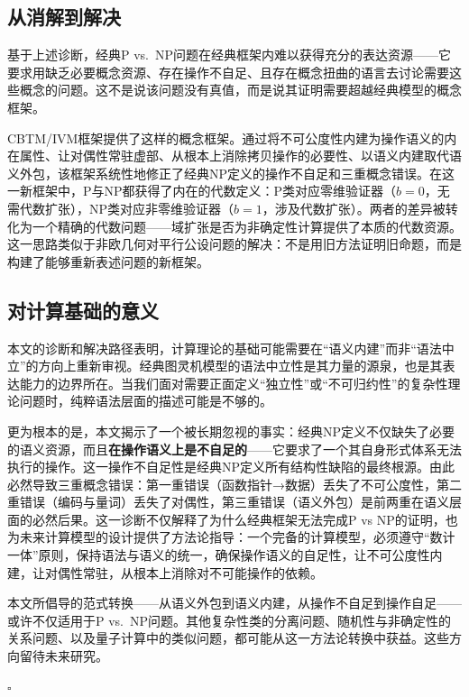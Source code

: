 \documentclass{ctexart}
\begin{document}
	\subsection{从消解到解决}
	
	基于上述诊断，经典P vs.\ NP问题在经典框架内难以获得充分的表达资源——它要求用缺乏必要概念资源、存在操作不自足、且存在概念扭曲的语言去讨论需要这些概念的问题。这不是说该问题没有真值，而是说其证明需要超越经典模型的概念框架。
	
	CBTM/IVM框架提供了这样的概念框架。通过将不可公度性内建为操作语义的内在属性、让对偶性常驻虚部、从根本上消除拷贝操作的必要性、以语义内建取代语义外包，该框架系统性地修正了经典NP定义的操作不自足和三重概念错误。在这一新框架中，P与NP都获得了内在的代数定义：P类对应零维验证器（$b=0$，无需代数扩张），NP类对应非零维验证器（$b=1$，涉及代数扩张）。两者的差异被转化为一个精确的代数问题——域扩张是否为非确定性计算提供了本质的代数资源。这一思路类似于非欧几何对平行公设问题的解决：不是用旧方法证明旧命题，而是构建了能够重新表述问题的新框架。
	
	\subsection{对计算基础的意义}
	
	本文的诊断和解决路径表明，计算理论的基础可能需要在``语义内建''而非``语法中立''的方向上重新审视。经典图灵机模型的语法中立性是其力量的源泉，也是其表达能力的边界所在。当我们面对需要正面定义``独立性''或``不可归约性''的复杂性理论问题时，纯粹语法层面的描述可能是不够的。
	
	更为根本的是，本文揭示了一个被长期忽视的事实：经典NP定义不仅缺失了必要的语义资源，而且\textbf{在操作语义上是不自足的}——它要求了一个其自身形式体系无法执行的操作。这一操作不自足性是经典NP定义所有结构性缺陷的最终根源。由此必然导致三重概念错误：第一重错误（函数指针→数据）丢失了不可公度性，第二重错误（编码与量词）丢失了对偶性，第三重错误（语义外包）是前两重在语义层面的必然后果。这一诊断不仅解释了为什么经典框架无法完成P vs NP的证明，也为未来计算模型的设计提供了方法论指导：一个完备的计算模型，必须遵守``数计一体''原则，保持语法与语义的统一，确保操作语义的自足性，让不可公度性内建，让对偶性常驻，从根本上消除对不可能操作的依赖。
	
	本文所倡导的范式转换——从语义外包到语义内建，从操作不自足到操作自足——或许不仅适用于P vs.\ NP问题。其他复杂性类的分离问题、随机性与非确定性的关系问题、以及量子计算中的类似问题，都可能从这一方法论转换中获益。这些方向留待未来研究。
	
	\hfill $\square$
	
	
	
	
\end{document}
